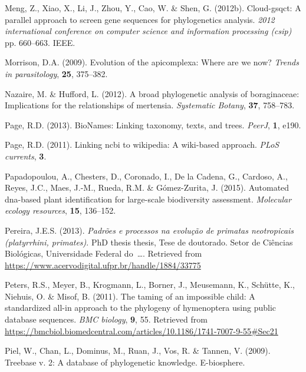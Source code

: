 \documentclass[]{article}
\begin{document}
\leavevmode\hypertarget{ref-meng2012cloud}{}%
Meng, Z., Xiao, X., Li, J., Zhou, Y., Cao, W. \& Shen, G. (2012b). Cloud-gsqct: A parallel approach to screen gene sequences for phylogenetics analysis. \emph{2012 international conference on computer science and information processing (csip)} pp. 660--663. IEEE.

\leavevmode\hypertarget{ref-morrison2009apicomplexa}{}%
Morrison, D.A. (2009). Evolution of the apicomplexa: Where are we now? \emph{Trends in parasitology}, \textbf{25}, 375--382.

\leavevmode\hypertarget{ref-nazaire2012broad}{}%
Nazaire, M. \& Hufford, L. (2012). A broad phylogenetic analysis of boraginaceae: Implications for the relationships of mertensia. \emph{Systematic Botany}, \textbf{37}, 758--783.

\leavevmode\hypertarget{ref-page2013bionames}{}%
Page, R.D. (2013). BioNames: Linking taxonomy, texts, and trees. \emph{PeerJ}, \textbf{1}, e190.

\leavevmode\hypertarget{ref-page2011linking}{}%
Page, R.D. (2011). Linking ncbi to wikipedia: A wiki-based approach. \emph{PLoS currents}, \textbf{3}.

\leavevmode\hypertarget{ref-papadopoulou2015automated}{}%
Papadopoulou, A., Chesters, D., Coronado, I., De la Cadena, G., Cardoso, A., Reyes, J.C., Maes, J.-M., Rueda, R.M. \& Gómez-Zurita, J. (2015). Automated dna-based plant identification for large-scale biodiversity assessment. \emph{Molecular ecology resources}, \textbf{15}, 136--152.

\leavevmode\hypertarget{ref-pereira2013padroes}{}%
Pereira, J.E.S. (2013). \emph{Padrões e processos na evolução de primatas neotropicais (platyrrhini, primates)}. PhD thesis thesis, Tese de doutorado. Setor de Ciências Biológicas, Universidade Federal do~\ldots{}. Retrieved from \url{https://www.acervodigital.ufpr.br/handle/1884/33775}

\leavevmode\hypertarget{ref-peters2011taming}{}%
Peters, R.S., Meyer, B., Krogmann, L., Borner, J., Meusemann, K., Schütte, K., Niehuis, O. \& Misof, B. (2011). The taming of an impossible child: A standardized all-in approach to the phylogeny of hymenoptera using public database sequences. \emph{BMC biology}, \textbf{9}, 55. Retrieved from \url{https://bmcbiol.biomedcentral.com/articles/10.1186/1741-7007-9-55\#Sec21}

\leavevmode\hypertarget{ref-piel2009treebase}{}%
Piel, W., Chan, L., Dominus, M., Ruan, J., Vos, R. \& Tannen, V. (2009). Treebase v. 2: A database of phylogenetic knowledge. E-biosphere.
\end{document}

